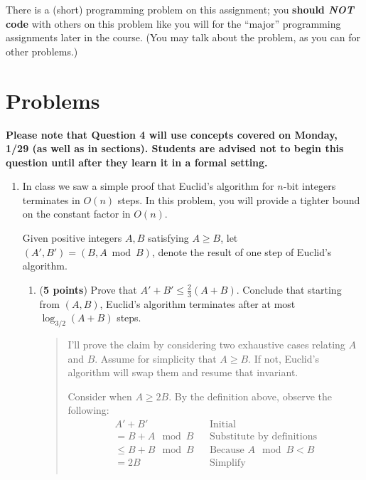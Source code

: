 \documentclass[11pt]{article}
\begin{document}
There is a (short) programming problem on this assignment; you {\bf should \textit{NOT} code} with others on
this problem like you will for the ``major'' programming assignments later in the course. (You may
talk about the problem, as you can for other problems.)


\section*{Problems}

\textbf{Please note that Question 4 will use concepts covered on Monday, 1/29 (as well as in sections). Students are advised not to begin this question until after they learn it in a formal setting.}

\begin{enumerate}[leftmargin=*]


\item In class we saw a simple proof that Euclid's algorithm for $n$-bit integers terminates in $O(n)$ steps. In this problem, you will provide a tighter bound on the constant factor in $O(n)$.

Given positive integers $A, B$ satisfying $A \ge B$, let $(A',B') = (B,A \bmod B)$, denote the result of one step of Euclid's algorithm.

\begin{enumerate}
    \item (\textbf{5 points}) Prove that $A' + B' \le \frac{2}{3}(A + B)$. Conclude that starting from $(A,B)$, Euclid's algorithm terminates after at most $\log_{3/2}(A+B)$ steps.
      \begin{quote}
        \color{purple}
        I'll prove the claim by considering two exhaustive cases relating $A$ and $B$. Assume for simplicity that $A \geq B$. If not, Euclid's algorithm will swap them and resume that invariant. 

        \medskip
        Consider when $A \geq 2B$. By the definition above, observe the following: 
        \begin{align*}
            && A' + B' && \text{Initial} && \\
            && = B + A \mod B && \text{Substitute by definitions} && \\
            && \leq B + B \mod B && \text{Because $A \mod B < B$} && \\
            && = 2B && \text{Simplify} && \\
        \end{align*} 


\end{quote}
\end{enumerate}
\end{enumerate}
\end{document}
